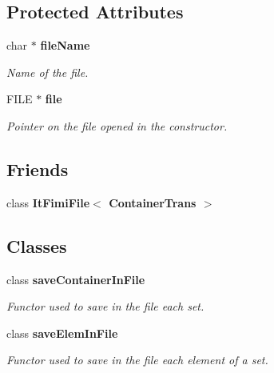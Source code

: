 \subsection*{Protected Attributes}
\begin{CompactItemize}
\item 
char $\ast$ {\bf file\-Name}\label{class_fimi_file_c_b2aa38060e5b0dc4d418f1a4092ed2f7}

\begin{CompactList}\small\item\em Name of the file. \item\end{CompactList}\item 
FILE $\ast$ {\bf file}\label{class_fimi_file_c_b8e85ad5531c46c9cda6b77d1b8c4595}

\begin{CompactList}\small\item\em Pointer on the file opened in the constructor. \item\end{CompactList}\end{CompactItemize}
\subsection*{Friends}
\begin{CompactItemize}
\item 
class {\bf It\-Fimi\-File$<$ Container\-Trans $>$}\label{class_fimi_file_c_57b935cc582c76558494a565e3a284f0}

\end{CompactItemize}
\subsection*{Classes}
\begin{CompactItemize}
\item 
class {\bf save\-Container\-In\-File}
\begin{CompactList}\small\item\em Functor used to save in the file each set. \item\end{CompactList}\item 
class {\bf save\-Elem\-In\-File}
\begin{CompactList}\small\item\em Functor used to save in the file each element of a set. \item\end{CompactList}\end{CompactItemize}


